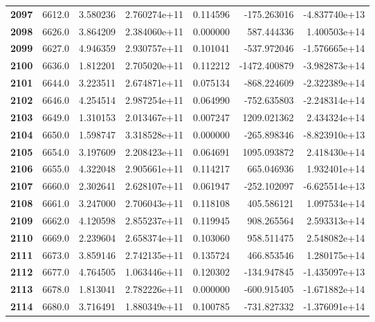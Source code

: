 \documentclass{report}[12pt]
\begin{document}
\begin{center}
\begin{tabular}{lrrrrrr}
\textbf{2097} &         6612.0 &   3.580236 &  2.760274e+11 &    0.114596 &  -175.263016 & -4.837740e+13 \\
\textbf{2098} &         6626.0 &   3.864209 &  2.384060e+11 &    0.000000 &   587.444336 &  1.400503e+14 \\
\textbf{2099} &         6627.0 &   4.946359 &  2.930757e+11 &    0.101041 &  -537.972046 & -1.576665e+14 \\
\textbf{2100} &         6636.0 &   1.812201 &  2.705020e+11 &    0.112212 & -1472.400879 & -3.982873e+14 \\
\textbf{2101} &         6644.0 &   3.223511 &  2.674871e+11 &    0.075134 &  -868.224609 & -2.322389e+14 \\
\textbf{2102} &         6646.0 &   4.254514 &  2.987254e+11 &    0.064990 &  -752.635803 & -2.248314e+14 \\
\textbf{2103} &         6649.0 &   1.310153 &  2.013467e+11 &    0.007247 &  1209.021362 &  2.434324e+14 \\
\textbf{2104} &         6650.0 &   1.598747 &  3.318528e+11 &    0.000000 &  -265.898346 & -8.823910e+13 \\
\textbf{2105} &         6654.0 &   3.197609 &  2.208423e+11 &    0.064691 &  1095.093872 &  2.418430e+14 \\
\textbf{2106} &         6655.0 &   4.322048 &  2.905661e+11 &    0.114217 &   665.046936 &  1.932401e+14 \\
\textbf{2107} &         6660.0 &   2.302641 &  2.628107e+11 &    0.061947 &  -252.102097 & -6.625514e+13 \\
\textbf{2108} &         6661.0 &   3.247000 &  2.706043e+11 &    0.118108 &   405.586121 &  1.097534e+14 \\
\textbf{2109} &         6662.0 &   4.120598 &  2.855237e+11 &    0.119945 &   908.265564 &  2.593313e+14 \\
\textbf{2110} &         6669.0 &   2.239604 &  2.658374e+11 &    0.103060 &   958.511475 &  2.548082e+14 \\
\textbf{2111} &         6673.0 &   3.859146 &  2.742135e+11 &    0.135724 &   466.853546 &  1.280175e+14 \\
\textbf{2112} &         6677.0 &   4.764505 &  1.063446e+11 &    0.120302 &  -134.947845 & -1.435097e+13 \\
\textbf{2113} &         6678.0 &   1.813041 &  2.782226e+11 &    0.000000 &  -600.915405 & -1.671882e+14 \\
\textbf{2114} &         6680.0 &   3.716491 &  1.880349e+11 &    0.100785 &  -731.827332 & -1.376091e+14 \\

\end{tabular}
\end{center}
\end{document}
